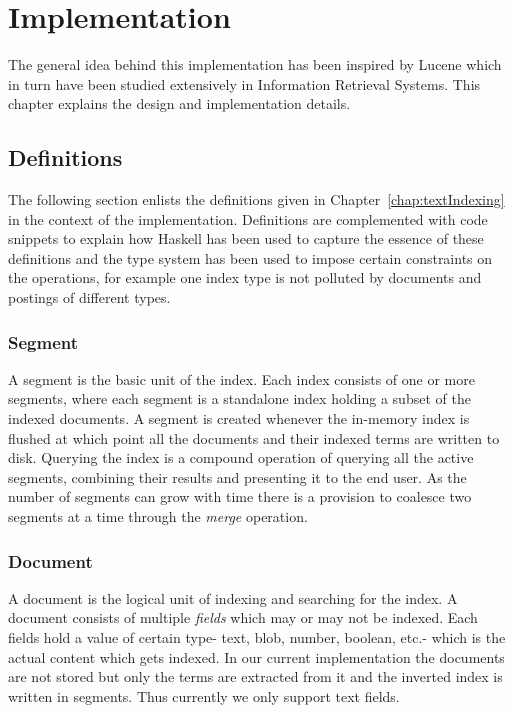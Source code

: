 \chapter{Implementation}
\label{chap:implementation}

The general idea behind this implementation has been inspired by Lucene\cite{goetz2000lucene}
which in turn have been studied extensively in Information Retrieval Systems.
This chapter explains the design and implementation details.

\section{Definitions}
The following section enlists the definitions given in Chapter~\ref{chap:textIndexing} in the context of the implementation.
Definitions are complemented with code snippets to explain how Haskell has been used to capture the essence of these definitions and
the type system has been used to impose certain constraints on the operations,
for example one index type is not polluted by documents and postings of different types.

\subsection{Segment}
A segment is the basic unit of the index.
Each index consists of one or more segments, where each segment is a standalone index holding a subset of the indexed documents\cite{mccandless2010lucene}.
A segment is created whenever the in-memory index is flushed at which point all the documents and their indexed terms are written to disk.
Querying the index is a compound operation of querying all the active segments, combining their results and presenting it to the end user.
As the number of segments can grow with time there is a provision to coalesce two segments at a time through the \textit{merge} operation.

\subsection{Document}
A document is the logical unit of indexing and searching for the index.
A document consists of multiple \textit{fields} which may or may not be indexed.
Each fields hold a value of certain type- text, blob, number, boolean, etc.- which is the actual content which gets indexed.
In our current implementation the documents are not stored but only the terms are extracted from it and the inverted index is written in segments.
Thus currently we only support text fields.

